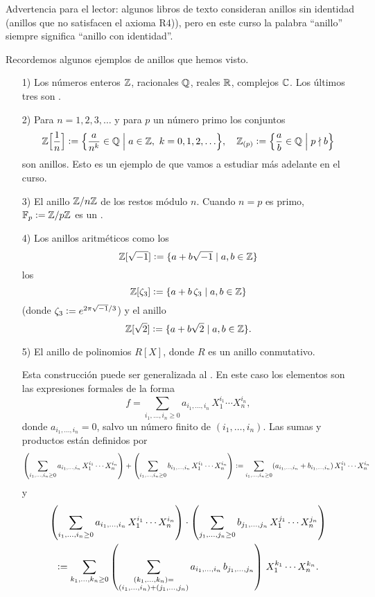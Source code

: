 Advertencia para el lector: algunos libros de texto consideran anillos
sin identidad (anillos que no satisfacen el axioma R4)), pero en este curso
la palabra ``anillo'' siempre significa ``anillo con identidad''.

\vspace{1em}

Recordemos algunos ejemplos de anillos que hemos visto.

\begin{enumerate}
\item[1)] Los números enteros $\mathbb{Z}$, racionales $\mathbb{Q}$, reales $\mathbb{R}$, complejos
  $\mathbb{C}$. Los últimos tres son .

\item[2)] Para $n = 1,2,3,\ldots$ y para $p$ un número primo los conjuntos
  \[ \mathbb{Z} \Bigl[\frac{1}{n}\Bigr] \mathrel{\mathop:}=
     \Bigl\{ \frac{a}{n^k}\in\mathbb{Q} \Bigm| a\in\mathbb{Z}, ~ k = 0,1,2,\ldots \Bigr\}, \quad
  \mathbb{Z}_{(p)} \mathrel{\mathop:}= \Bigl\{ \frac{a}{b} \in \mathbb{Q} \Bigm| p\nmid b \Bigr\} \]
  son anillos. Esto es un ejemplo de  que vamos a estudiar
  más adelante en el curso.

\item[3)] El anillo $\mathbb{Z}/n\mathbb{Z}$ de los restos módulo $n$. Cuando $n = p$
  es primo, $\mathbb{F}_p \mathrel{\mathop:}= \mathbb{Z}/p\mathbb{Z}$ es un .

\item[4)] Los anillos aritméticos como los 
  $$\mathbb{Z} [\sqrt{-1}] \mathrel{\mathop:}= \{ a + b\sqrt{-1} \mid a,b\in \mathbb{Z} \}$$
  los 
  $$\mathbb{Z} [\zeta_3] \mathrel{\mathop:}= \{ a + b\,\zeta_3 \mid a,b\in \mathbb{Z} \}$$
  (donde $\zeta_3 \mathrel{\mathop:}= e^{2\pi\sqrt{-1}/3}$) y el anillo
  $$\mathbb{Z} [\sqrt{2}] \mathrel{\mathop:}= \{ a + b\sqrt{2} \mid a,b\in \mathbb{Z} \}.$$

\item[5)] El anillo de polinomios $R [X]$, donde $R$ es un anillo conmutativo.

  Esta construcción puede ser generalizada al . En este caso
  los elementos son las expresiones formales de la forma
  $$f = \sum_{i_1,\ldots,i_n \ge 0} a_{i_1,\ldots,i_n}\,X_1^{i_1}\cdots X_n^{i_n},$$
  donde $a_{i_1,\ldots,i_n} = 0$, salvo un número finito de
  $(i_1,\ldots,i_n)$. Las sumas y productos están definidos por
  \[ \left(\sum_{i_1,\ldots,i_n \ge 0} a_{i_1,\ldots,i_n}\,X_1^{i_1}\cdots X_n^{i_n}\right) +
     \left(\sum_{i_1,\ldots,i_n \ge 0} b_{i_1,\ldots,i_n}\,X_1^{i_1}\cdots X_n^{i_n}\right) \mathrel{\mathop:}=
     \sum_{i_1,\ldots,i_n \ge 0} (a_{i_1,\ldots,i_n} + b_{i_1,\ldots,i_n})\,X_1^{i_1}\cdots X_n^{i_n} \]
  y
  \begin{multline*}
    \left(\sum_{i_1,\ldots,i_n \ge 0} a_{i_1,\ldots,i_n}\,X_1^{i_1}\cdots X_n^{i_n}\right) \cdot \left(\sum_{j_1,\ldots,j_n \ge 0} b_{j_1,\ldots,j_n}\,X_1^{j_1}\cdots X_n^{j_n}\right) \\
    \mathrel{\mathop:}= \sum_{k_1,\ldots,k_n \ge 0} \left(\sum_{\substack{(k_1,\ldots,k_n) = \\ (i_1,\ldots,i_n) + (j_1,\ldots,j_n)}} a_{i_1,\ldots,i_n}\,b_{j_1,\ldots,j_n}\right)\,X_1^{k_1}\cdots X_n^{k_n}.
  \end{multline*}


\end{enumerate}
